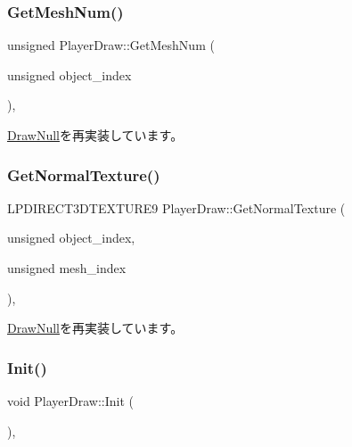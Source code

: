 \subsubsection{\texorpdfstring{Get\+Mesh\+Num()}{GetMeshNum()}}
{\footnotesize\ttfamily unsigned Player\+Draw\+::\+Get\+Mesh\+Num (\begin{DoxyParamCaption}\item[{unsigned}]{object\+\_\+index }\end{DoxyParamCaption})\hspace{0.3cm}{\ttfamily [override]}, {\ttfamily [virtual]}}



\mbox{\hyperlink{class_draw_null_ad735978a85a5f3583eecd82d6bfe6413}{Draw\+Null}}を再実装しています。

\mbox{\label{class_player_draw_abb93b530e38fc224ecbfe17d623f10fb}} 
\subsubsection{\texorpdfstring{Get\+Normal\+Texture()}{GetNormalTexture()}}
{\footnotesize\ttfamily L\+P\+D\+I\+R\+E\+C\+T3\+D\+T\+E\+X\+T\+U\+R\+E9 Player\+Draw\+::\+Get\+Normal\+Texture (\begin{DoxyParamCaption}\item[{unsigned}]{object\+\_\+index,  }\item[{unsigned}]{mesh\+\_\+index }\end{DoxyParamCaption})\hspace{0.3cm}{\ttfamily [override]}, {\ttfamily [virtual]}}



\mbox{\hyperlink{class_draw_null_a41b7d148612b2d328e85289e32dc374c}{Draw\+Null}}を再実装しています。

\mbox{\label{class_player_draw_ad79a0fbeb618e0913822b573e5d0be68}} 
\subsubsection{\texorpdfstring{Init()}{Init()}}
{\footnotesize\ttfamily void Player\+Draw\+::\+Init (\begin{DoxyParamCaption}{ }\end{DoxyParamCaption})\hspace{0.3cm}{\ttfamily [override]}, {\ttfamily [virtual]}}



